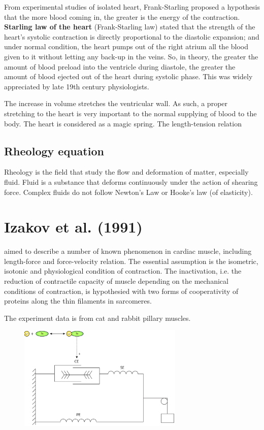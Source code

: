 From experimental studies of isolated heart, Frank-Starling proposed a
hypothesis that the more blood coming in, the greater is the energy of the
contraction.
{\bf Starling law of the heart} (Frank-Starling law) stated that the strength of
the heart's systolic contraction is directly proportional to the diastolic
expansion; and under normal condition, the heart pumps out of the right atrium
all the blood given to it without letting any back-up in the veins.
So, in theory, the greater the amount of blood preload into the ventricle during
diastole, the greater the amount of blood ejected out of the heart during
systolic phase. This was widely appreciated by late 19th century physiologists.

The increase in volume stretches the ventricular wall. As such, a proper
stretching to the heart is very important to the normal supplying of blood to
the body. The heart is considered as a magic spring. The length-tension relation






\subsection{Rheology equation}

Rheology is the field that study the flow and deformation of matter, especially
fluid. Fluid is a substance that deforms continuously under the action of
shearing force. Complex fluids do not follow Newton's Law or Hooke's law (of
elasticity).



\section{Izakov et al. (1991)}

\citep{izakov1991} aimed to describe a number of known phenomenon in cardiac
muscle, including length-force and force-velocity relation. The essential
assumption is the isometric, isotonic and physiological condition of
contraction. The inactivation, i.e. the reduction of contractile capacity of
muscle depending on the mechanical conditions of contraction, is hypothesied
with two forms of cooperativity of proteins along the thin filaments in
sarcomeres.

The experiment data is from cat and rabbit pillary muscles.

\begin{figure}[hbt]
  \centerline{\includegraphics[height=5cm,
    angle=0]{./images/izakov_Force-Ca.eps}}
  \caption{}
  \label{fig:izakov_Force-Ca}
\end{figure}


